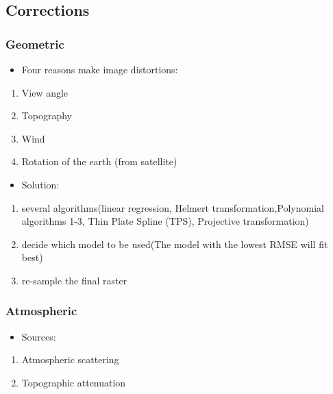 \documentclass[
  letterpaper,
  DIV=11,
  numbers=noendperiod]{scrreprt}
\providecommand{\tightlist}{%
  \setlength{\itemsep}{0pt}\setlength{\parskip}{0pt}}\usepackage{longtable,booktabs,array}
\begin{document}
\hypertarget{corrections}{%
\subsection{Corrections}\label{corrections}}

\hypertarget{geometric}{%
\subsubsection{Geometric}\label{geometric}}

\begin{itemize}
\tightlist
\item
  Four reasons make image distortions:
\end{itemize}

\begin{enumerate}
\def\labelenumi{\arabic{enumi}.}
\tightlist
\item
  View angle
\item
  Topography
\item
  Wind
\item
  Rotation of the earth (from satellite)
\end{enumerate}

\begin{itemize}
\tightlist
\item
  Solution:
\end{itemize}

\begin{enumerate}
\def\labelenumi{\arabic{enumi}.}
\tightlist
\item
  several algorithms(linear regression, Helmert
  transformation,Polynomial algorithms 1-3, Thin Plate Spline (TPS),
  Projective transformation)
\item
  decide which model to be used(The model with the lowest RMSE will fit
  best)
\item
  re-sample the final raster
\end{enumerate}

\hypertarget{atmospheric}{%
\subsubsection{Atmospheric}\label{atmospheric}}

\begin{itemize}
\tightlist
\item
  Sources:
\end{itemize}

\begin{enumerate}
\def\labelenumi{\arabic{enumi}.}
\tightlist
\item
  Atmospheric scattering
\item
  Topographic attenuation
\end{enumerate}
\end{document}
